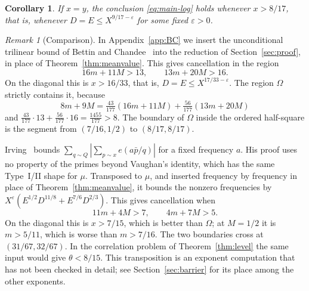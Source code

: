 \documentclass[11pt]{amsart}
\newtheorem{corollary}[theorem]{Corollary}
\theoremstyle{definition}
\theoremstyle{remark}
\newtheorem{remark}[theorem]{Remark}
\numberwithin{equation}{section}
\newcommand{\eps}{\varepsilon}
\begin{document}
\begin{corollary}\label{cor:diagonal}
If $x=y$, the conclusion \eqref{eq:main-log} holds whenever $x>8/17$, that
is, whenever $D=E\le X^{9/17-\eps}$ for some fixed $\eps>0$.
\end{corollary}

\begin{remark}[Comparison]\label{rem:comparison}
In Appendix~\ref{app:BC} we insert the unconditional trilinear bound of
Bettin and Chandee~\cite{BC} into the reduction of Section~\ref{sec:proof},
in place of Theorem~\ref{thm:meanvalue}.  This gives cancellation in the
region
\[
 16m+11M>13,\qquad 13m+20M>16 .
\]
On the diagonal this is $x>16/33$, that is, $D=E\le X^{17/33-\eps}$.  The
region $\Omega$ strictly contains it, because
\[
 8m+9M=\tfrac{43}{177}(16m+11M)+\tfrac{56}{177}(13m+20M)
\]
and $\tfrac{43}{177}\cdot 13+\tfrac{56}{177}\cdot16=\tfrac{1455}{177}>8$.
The boundary of $\Omega$ inside the ordered half-square is the segment from
$(7/16,1/2)$ to $(8/17,8/17)$.

Irving~\cite[Theorem~1.3]{Irv14} bounds
$\sum_{q\sim Q}|\sum_{p\sim x}e(a\bar p/q)|$ for a fixed frequency $a$.  His
proof uses no property of the primes beyond Vaughan's identity, which has
the same Type~I/II shape for $\mu$.  Transposed to $\mu$, and inserted
frequency by frequency in place of Theorem~\ref{thm:meanvalue}, it bounds
the nonzero frequencies by $X^{\eps}(E^{1/2}D^{11/8}+E^{7/6}D^{2/3})$.  This
gives cancellation when
\[
 11m+4M>7,\qquad 4m+7M>5 .
\]
On the diagonal this is $x>7/15$, which is better than $\Omega$; at
$M=1/2$ it is $m>5/11$, which is worse than $m>7/16$.  The two boundaries
cross at $(31/67,32/67)$.  In the correlation problem of
Theorem~\ref{thm:level} the same input would give $\theta<8/15$.  This
transposition is an exponent computation that has not been checked in
detail; see Section~\ref{sec:barrier} for its place among the other
exponents.
\end{remark}
\end{document}
